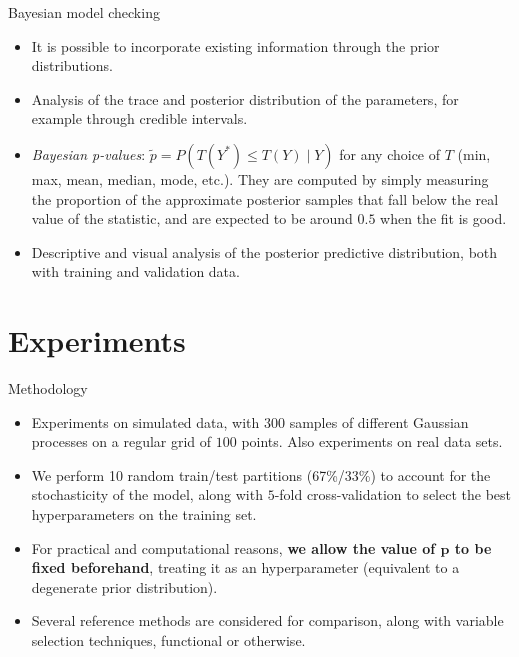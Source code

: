 \documentclass[10pt, english, professionalfonts]{beamer}
\begin{document}
\begin{frame}{Bayesian model checking}
  \begin{itemize}
    \item It is possible to incorporate existing information through the prior distributions.
    \item Analysis of the trace and posterior distribution of the parameters, for example through credible intervals.
    \item \textit{Bayesian p-values}: \(\tilde p=P(T(Y^*)\leq T(Y)\mid Y)\) for any choice of \(T\) (min, max, mean, median, mode, etc.). They are computed by simply measuring the proportion of the approximate posterior samples that fall below the real value of the statistic, and are expected to be around \(0.5\) when the fit is good.
    \item Descriptive and visual analysis of the posterior predictive distribution, both with training and validation data.
  \end{itemize}

\end{frame}

\section{Experiments}

\begin{frame}{Methodology}
  \begin{itemize}
    \item Experiments on simulated data, with \(300\) samples of different Gaussian processes on a regular grid of \(100\) points. Also experiments on real data sets.
    \item We perform 10 random train/test partitions (67\%/33\%) to account for the stochasticity of the model, along with \(5\)-fold cross-validation to select the best hyperparameters on the training set.
    \item For practical and computational reasons, \textbf{we allow the value of \(\bm{p}\) to be fixed beforehand}, treating it as an hyperparameter (equivalent to a degenerate prior distribution).
    \item Several reference methods are considered for comparison, along with variable selection techniques, functional or otherwise.

  \end{itemize}
\end{frame}
\end{document}

